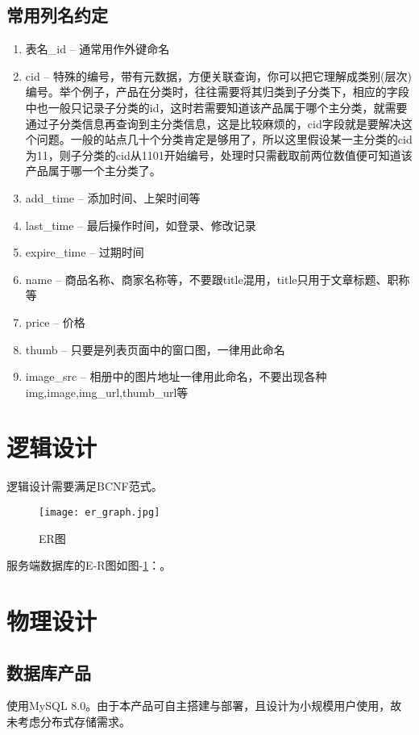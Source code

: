 \subsection{常用列名约定}
\begin{enumerate}
    \item 表名\_id – 通常用作外键命名
    \item cid – 特殊的编号，带有元数据，方便关联查询，你可以把它理解成类别(层次)编号。举个例子，产品在分类时，往往需要将其归类到子分类下，相应的字段中也一般只记录子分类的id，这时若需要知道该产品属于哪个主分类，就需要通过子分类信息再查询到主分类信息，这是比较麻烦的，cid字段就是要解决这个问题。一般的站点几十个分类肯定是够用了，所以这里假设某一主分类的cid为11，则子分类的cid从1101开始编号，处理时只需截取前两位数值便可知道该产品属于哪一个主分类了。
    \item add\_time – 添加时间、上架时间等
    \item last\_time – 最后操作时间，如登录、修改记录
    \item expire\_time – 过期时间
    \item name – 商品名称、商家名称等，不要跟title混用，title只用于文章标题、职称等
    \item price – 价格
    \item thumb – 只要是列表页面中的窗口图，一律用此命名
    \item image\_src – 相册中的图片地址一律用此命名，不要出现各种img,image,img\_url,thumb\_url等
\end{enumerate}

\section{逻辑设计}
逻辑设计需要满足BCNF范式。
\begin{figure}[h]
	\centering
	\texttt{[image: er\_graph.jpg]}
	\caption{ER图} \label{fig:er_graph}
\end{figure}
服务端数据库的E-R图如图-\ref{fig:er_graph}：。

\section{物理设计}
\subsection{数据库产品}
使用MySQL 8.0。由于本产品可自主搭建与部署，且设计为小规模用户使用，故未考虑分布式存储需求。


